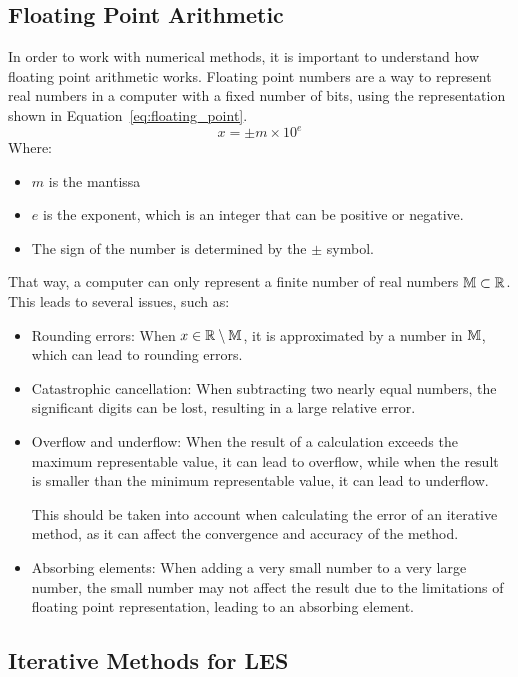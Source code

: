 \subsection{Floating Point Arithmetic}

In order to work with numerical methods, it is important to understand how floating point arithmetic works. Floating point numbers are a way to represent real numbers in a computer with a fixed number of bits, using the representation shown in Equation~\ref{eq:floating_point}.
\begin{equation}
    x = \pm m \times 10^e
    \label{eq:floating_point}
\end{equation}
Where:
\begin{itemize}
    \item $m$ is the mantissa
    \item $e$ is the exponent, which is an integer that can be positive or negative.
    \item The sign of the number is determined by the $\pm$ symbol.
\end{itemize}

That way, a computer can only represent a finite number of real numbers $\mathbb{M}\subset \mathbb{R}$. This leads to several issues, such as:
\begin{itemize}
    \item Rounding errors: When $x\in \mathbb{R}\setminus \mathbb{M}$, it is approximated by a number in $\mathbb{M}$, which can lead to rounding errors.
    \item Catastrophic cancellation: When subtracting two nearly equal numbers, the significant digits can be lost, resulting in a large relative error.
    \item Overflow and underflow: When the result of a calculation exceeds the maximum representable value, it can lead to overflow, while when the result is smaller than the minimum representable value, it can lead to underflow.
    
    This should be taken into account when calculating the error of an iterative method, as it can affect the convergence and accuracy of the method.
    \item Absorbing elements: When adding a very small number to a very large number, the small number may not affect the result due to the limitations of floating point representation, leading to an absorbing element.
\end{itemize}


\subsection{Iterative Methods for LES}

